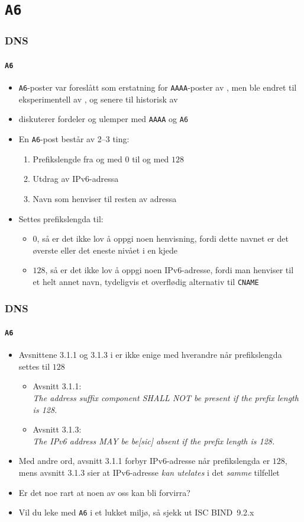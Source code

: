 \section{\texttt{A6}}
\begin{frame}
  \frametitle{DNS}
  \framesubtitle{\texttt{A6}}
  \begin{itemize}
  \item \texttt{A6}-poster var foreslått som erstatning for
    \texttt{AAAA}-poster av , men ble endret til
    eksperimentell av , og senere til historisk av
  \item {} diskuterer fordeler og ulemper med \texttt{AAAA} og
    \texttt{A6}
  \item En \texttt{A6}-post består av 2--3 ting:
    \begin{enumerate}
    \item Prefikslengde fra og med \(0\) til og med \(128\)
    \item Utdrag av IPv6-adressa
    \item Navn som henviser til resten av adressa
    \end{enumerate}
  \item Settes prefikslengda til:
    \begin{itemize}
    \item \(0\), så er det \alert{ikke} lov å oppgi noen henvisning,
      fordi dette navnet er det øverste eller det eneste nivået i en
      kjede
    \item \(128\), så er det \alert{ikke} lov å oppgi noen IPv6-adresse,
      fordi man henviser til et helt annet navn, tydeligvis et
      overflødig alternativ til \texttt{CNAME}
    \end{itemize}
  \end{itemize}
\end{frame}

\begin{frame}
  \frametitle{DNS}
  \framesubtitle{\texttt{A6}}
  \begin{itemize}
  \item Avsnittene 3.1.1 og 3.1.3 i  er ikke enige med
    hverandre når prefikslengda settes til \(128\)
    \begin{itemize}
    \item Avsnitt 3.1.1:\\
      \textit{The address suffix component SHALL NOT be present if the prefix
      length is 128.\/}
  \item Avsnitt 3.1.3:\\
    \textit{The IPv6 address MAY be be\textnormal{[sic]} absent if the
      prefix length is 128.\/}
    \end{itemize}
  \item Med andre ord, avsnitt 3.1.1 forbyr IPv6-adresse når
    prefikslengda er \(128\), mens avsnitt 3.1.3 sier at IPv6-adresse
    \textit{kan utelates\/} i det \textit{samme\/} tilfellet
  \item Er det noe rart at noen av oss kan bli forvirra?
  \item Vil du leke med \texttt{A6} i et lukket miljø, så sjekk ut
    ISC BIND~9.2.x
  \end{itemize}
\end{frame}

